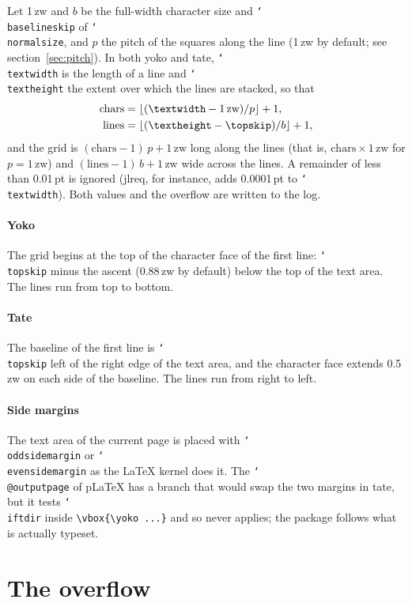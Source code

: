 \documentclass{article}
\newcommand*\cs[1]{\texttt{\char`\\#1}}
\begin{document}
Let 1\,zw and $b$ be the full-width character size and
\cs{baselineskip} of \cs{normalsize}, and $p$ the pitch of the squares
along the line (1\,zw by default; see section~\ref{sec:pitch}).  In
both yoko and tate, \cs{textwidth} is the length of a line and
\cs{textheight} the extent over which the lines are stacked, so that
\begin{align*}
  \text{chars} &= \lfloor (\cs{textwidth} - 1\,\text{zw}) / p \rfloor + 1,\\
  \text{lines} &= \lfloor (\cs{textheight} - \cs{topskip}) / b \rfloor + 1,
\end{align*}
and the grid is $(\text{chars}-1)\,p + 1\,\text{zw}$ long along the
lines (that is, $\text{chars}\times 1\,\text{zw}$ for $p=1\,\text{zw}$)
and $(\text{lines}-1)\,b + 1\,\text{zw}$ wide across the lines.
A remainder of less than 0.01\,pt is ignored (jlreq, for instance, adds
0.0001\,pt to \cs{textwidth}).  Both values and the overflow are written
to the log.

\paragraph{Yoko}
The grid begins at the top of the character face of the first line:
\cs{topskip} minus the ascent (0.88\,zw by default) below the top of the
text area.  The lines run from top to bottom.

\paragraph{Tate}
The baseline of the first line is \cs{topskip} left of the right edge of
the text area, and the character face extends 0.5\,zw on each side of
the baseline.  The lines run from right to left.

\paragraph{Side margins}
The text area of the current page is placed with \cs{oddsidemargin} or
\cs{evensidemargin} as the LaTeX kernel does it.  The \cs{@outputpage}
of pLaTeX has a branch that would swap the two margins in tate, but it
tests \cs{iftdir} inside \verb|\vbox{\yoko ...}| and so never applies;
the package follows what is actually typeset.

\section{The overflow}
\end{document}
